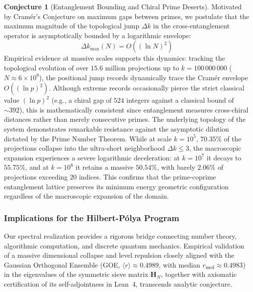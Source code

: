 \documentclass{article}
\numberwithin{equation}{section}
\theoremstyle{plain}
\theoremstyle{definition}
\newtheorem{conjecture}[theorem]{Conjecture}
\begin{document}
\begin{conjecture}[Entanglement Bounding and Chiral Prime Deserts]
\label{conj:cramer-entrelazamiento}
Motivated by Cramér's Conjecture on maximum gaps between primes, we postulate that the maximum magnitude of the topological jump $\Delta k$ in the cross-entanglement operator is asymptotically bounded by a logarithmic envelope:
\begin{equation}
\Delta k_{\max}(N) = O\left((\ln N)^2\right)
\end{equation}
Empirical evidence at massive scales supports this dynamics: tracking the topological evolution of over $15.6$ million projections up to $k = 100\,000\,000$ ($N \approx 6 \times 10^8$), the positional jump records dynamically trace the Cramér envelope $O((\ln p)^2)$. Although extreme records occasionally pierce the strict classical value $(\ln p)^2$ (e.g., a chiral gap of $524$ integers against a classical bound of $\sim 392$), this is mathematically consistent since entanglement measures cross-chiral distances rather than merely consecutive primes. The underlying topology of the system demonstrates remarkable resistance against the asymptotic dilution dictated by the Prime Number Theorem. While at scale $k=10^5$, $70.35\%$ of the projections collapse into the ultra-short neighborhood $\Delta k \le 3$, the macroscopic expansion experiences a severe logarithmic deceleration: at $k=10^7$ it decays to $55.75\%$, and at $k=10^8$ it retains a massive $50.54\%$, with barely $2.06\%$ of projections exceeding $20$ indices. This confirms that the prime-coprime entanglement lattice preserves its minimum energy geometric configuration regardless of the macroscopic expansion of the domain.
\end{conjecture}

\subsubsection{Implications for the Hilbert-Pólya Program}

Our spectral realization provides a rigorous bridge connecting number theory, algorithmic computation, and discrete quantum mechanics. Empirical validation of a massive dimensional collapse and level repulsion closely aligned with the Gaussian Orthogonal Ensemble (GOE, $\langle r \rangle \approx 0.4989$, with median $r_{\text{med}} \approx 0.4983$) in the eigenvalues of the symmetric sieve matrix $\mathbf{H}_N$, together with axiomatic certification of its self-adjointness in Lean~4, transcends analytic conjecture.
\end{document}
